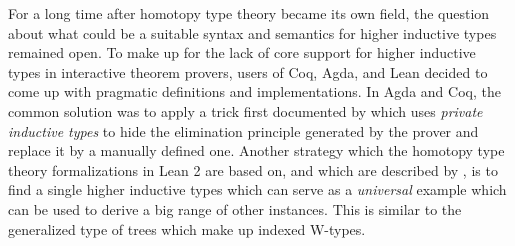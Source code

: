 For a long time after homotopy type theory became its own field,
the question about what could be a suitable syntax and semantics for
higher inductive types remained open.
To make up for the lack of core support for higher inductive types
in interactive theorem provers, users of Coq, Agda, and Lean decided to come
up with pragmatic definitions and implementations.
In Agda and Coq, the common solution was to apply a trick first documented by
\cite{licatatrick} which uses \emph{private inductive types} to
hide the elimination principle generated by the prover and replace it by
a manually defined one.
Another strategy which the homotopy type theory formalizations in Lean 2 are
based on, and which are described by \cite{leanhott},
is to find a single higher inductive types which can serve as a \emph{universal}
example which can be used to derive a big range of other instances.
This is similar to the generalized type of trees which make up indexed W-types.

